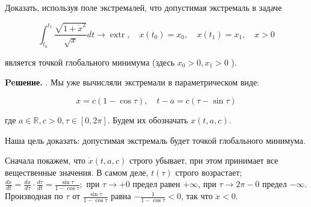 \begin{task}
Доказать, используя поле экстремалей, что допустимая экстремаль в задаче

$$
\int_{t_{0}}^{t_{1}} \frac{\sqrt{1+\dot{x}^{2}}}{\sqrt{x}} d t \rightarrow \operatorname{extr}, \quad x\left(t_{0}\right)=x_{0}, \quad x\left(t_{1}\right)=x_{1}, \quad x>0
$$

является точкой глобального минимума (здесь $x_{0}>0, x_{1}>0$ ).

\textbf{Peшение.} . Мы уже вычисляли экстремали в параметрическом виде:

$$
x=c(1-\cos \tau), \quad t-a=c(\tau-\sin \tau)
$$

где $a \in \mathbb{R}, c>0, \tau \in[0,2 \pi]$. Будем их обозначать $x(t, a, c)$.

Наша цель доказать: допустимая экстремаль будет точкой глобального минимума.

Сначала покажем, что $\dot{x}(t, a, c)$ строго убывает, при этом принимает все вещественные значения. В самом деле, $t(\tau)$ строго возрастает; $\frac{d x}{d t}=\frac{d x}{d \tau} \cdot \frac{d \tau}{d t}=\frac{\sin \tau}{1-\cos \tau} ;$ при $\tau \rightarrow+0$ предел равен $+\infty$, при $\tau \rightarrow 2 \pi-0$ предел $-\infty$. Производная по $\tau$ от $\frac{\sin \tau}{1-\cos \tau}$ равна $-\frac{1}{1-\cos \tau}<0$, так что $\ddot{x}<0$.
\end{task}